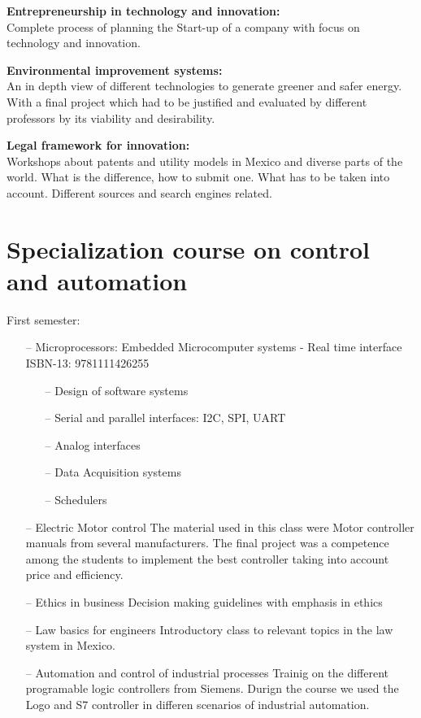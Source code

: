 \documentclass{article}
\begin{document}
\textbf{Entrepreneurship in technology and innovation:}\\
    Complete process of planning the Start-up of a company with focus on technology and innovation.

\textbf{Environmental improvement systems:}\\
    An in depth view of different technologies to generate greener and safer energy.
    With a final project which had to be justified and evaluated by different professors by
    its viability and desirability.


\textbf{Legal framework for innovation:}\\
    Workshops about patents and  utility models in Mexico and diverse parts of the world.
    What is the difference, how to submit one.
    What has to be taken into account.
    Different sources and search engines related.


\section{Specialization course on control and automation}


First semester:
    \begin{itemize}
     \setlength\itemsep{0pt}
        \item[--] Microprocessors:
            Embedded Microcomputer systems - Real time interface
                ISBN-13: 9781111426255
            \begin{itemize}
     \setlength\itemsep{0pt}
            \item[--] Design of software systems
            \item[--] Serial and parallel interfaces: I2C, SPI, UART
            \item[--] Analog interfaces
            \item[--] Data Acquisition systems
            \item[--] Schedulers
            \end{itemize}
        \item[--] Electric Motor control
        The material used in this class were Motor controller manuals from several manufacturers.
        The final project was a competence among the students to implement the best controller
        taking into account price and efficiency.

        \item[--] Ethics in business
        Decision making guidelines with emphasis in ethics

        \item[--] Law basics for engineers
        Introductory class to relevant topics in the law system in Mexico.

        \item[--] Automation and control of industrial processes
            Trainig on the different programable logic controllers from Siemens.
            Durign the course we used the Logo and S7 controller in differen scenarios of
            industrial automation.
    \end{itemize}
\end{document}
